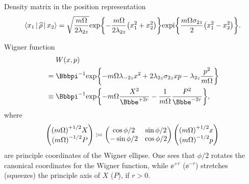 \begin{nameddef}{Density matrix in the position representation}
\begin{equation}
\Braket{x_1 | \widehat{\rho} | x_2} = \sqrt{\frac{m\Omega}{2\lambda_{2z}}}
{\exp}\mathopen{}\left\{-\frac{m\Omega}{2\lambda_{2z}}{\left(x_1^2 + x_2^2\right)}\right\}\mathclose{}
{\operatorname{expi}}\mathopen{}\left\{\frac{m\Omega\sigma_{2z}}{2}{\left(x_1^2-x_2^2\right)}\right\}\mathclose{}.
\end{equation}
\end{nameddef} %

\begin{nameddef}{Wigner function}
\begin{align}
	&\phantom{{}={}} \rfun{W}{x, p} \nonumber \\
	&= \pp^{-1} \cfun{\exp}{- m\Omega\lambda_{-2z} x^2
	+ 2 \lambda_{2z} \sigma_{2z} x p - \lambda_{2z} \frac{p^2}{m\Omega}} \\
	&\equiv \pp^{-1} \cfun{\exp}{-m\Omega \frac{X^2}{\ee^{+2r}} - 
		\frac{1}{m\Omega}\frac{P^2}{\ee^{-2r}}},
\end{align}
where
\begin{equation}
	\begin{pmatrix} {\left(m\Omega\right)}^{+1/2} X \\
		{\left(m\Omega\right)}^{-1/2} P \end{pmatrix} \coloneqq
	\begin{pmatrix}
	\cos\phi/2 & \sin\phi/2 \\ -\sin\phi/2 & \cos\phi/2
	\end{pmatrix}
	\begin{pmatrix} {\left(m\Omega\right)}^{+1/2} x \\
		{\left(m\Omega\right)}^{-1/2} p \end{pmatrix}
\end{equation}
are principle coordinates of the Wigner ellipse. One sees that 
$\phi/2$ rotates the canonical coordinates for the Wigner function, while
$\ee^{+r}$ ($\ee^{-r}$) stretches (squeezes) the principle axis of $X$ ($P$),
if $r > 0$.
\end{nameddef} %
